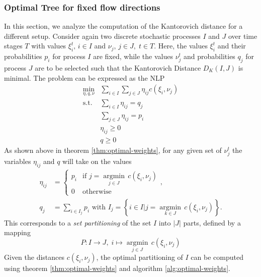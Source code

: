 \subsubsection{Optimal Tree for fixed flow directions}
In this section, we analyze the computation of the Kantorovich distance for a different setup. Consider again two discrete stochastic processes $I$ and $J$ over time stages $T$ with values $\xi_i^t,\,i\in I$ and $\nu_j,\, j\in J,\;t\in T$. Here, the values $\xi_i^t$ and their probabilities $p_i$ for process $I$ are fixed, while the values $\nu_j^t$ and probabilities $q_j$ for process $J$ are to be selected such that the Kantorovich Distance $D_K(I,J)$ is minimal. The problem can be expressed as the NLP
\begin{align}
  \min\limits_{\eta,q,\nu}&\sum_{i\in I}\sum_{j\in J}\eta_{ij}c(\xi_i,\nu_j)\\
  \text{s.t.}&\sum_{i\in I}\eta_{ij} = q_j\\
  &\sum_{j\in J}\eta_{ij} = p_i\\
  &\eta_{ij}\geq 0\\
  &q\geq 0
\end{align}
As shown above in theorem \ref{thm:optimal-weights}, for any given set of $\nu_j^t$ the variables $\eta_{ij}$ and $q$ will take on the values 
\begin{align}
  \eta_{ij} &= \left\{\begin{array}{lr}p_i&\text{if }j=\underset{j\in J}{\operatorname{argmin}}\, c(\xi_i,\nu_j)\\0&\text{otherwise}\end{array}\right. ,\\
  q_j &= \sum_{i\in I_j}p_i\text{ with } I_j= \left\{i\in I|j=\underset{k\in J}{\operatorname{argmin}}\, c(\xi_i,\nu_j)\right\}.
\end{align}
This corresponds to a \textit{set partitioning} of the set $I$ into $|J|$ parts, defined by a mapping 
\[P:I\rightarrow J,\; i\mapsto \underset{j\in J}{\operatorname{argmin}}\, c(\xi_i, \nu_j)\]
Given the distances $c(\xi_i,\nu_j)$, the optimal partitioning of $I$ can be computed using theorem \ref{thm:optimal-weights} and algorithm \ref{alg:optimal-weights}. 

